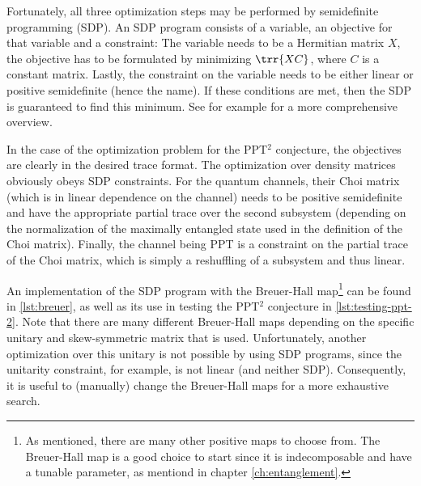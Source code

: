 Fortunately, all three optimization steps may be performed by semidefinite programming (SDP). An SDP program consists of a variable, an objective for that variable and a constraint: The variable needs to be a Hermitian matrix $X$, the objective has to be formulated by minimizing $\trr{XC}$, where $C$ is a constant matrix. Lastly, the constraint on the variable needs to be either linear or positive semidefinite (hence the name). If these conditions are met, then the SDP is guaranteed to find this minimum. See for example \cite{Vandenberghe1996} for a more comprehensive overview.

In the case of the optimization problem for the PPT$^2$ conjecture, the objectives are clearly in the desired trace format. The optimization over density matrices obviously obeys SDP constraints. For the quantum channels, their Choi matrix (which is in linear dependence on the channel) needs to be positive semidefinite and have the appropriate partial trace over the second subsystem (depending on the normalization of the maximally entangled state used in the definition of the Choi matrix). Finally, the channel being PPT is a constraint on the partial trace of the Choi matrix, which is simply a reshuffling of a subsystem and thus linear.

An implementation of the SDP program with the Breuer-Hall map\footnote{As mentioned, there are many other positive maps to choose from. The Breuer-Hall map is a good choice to start since it is indecomposable and have a tunable parameter, as mentiond in chapter \ref{ch:entanglement}.} can be found in \ref{lst:breuer}, as well as its use in testing the PPT$^2$ conjecture in \ref{lst:testing-ppt-2}. Note that there are many different Breuer-Hall maps depending on the specific unitary and skew-symmetric matrix that is used. Unfortunately, another optimization over this unitary is not possible by using SDP programs, since the unitarity constraint, for example, is not linear (and neither SDP). Consequently, it is useful to (manually) change the Breuer-Hall maps for a more exhaustive search.

